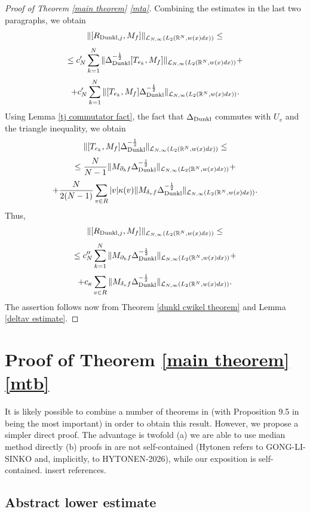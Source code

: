 \documentclass{amsart}
\begin{document}
\begin{proof}[Proof of Theorem \ref{main theorem} \eqref{mta}]
Combining the estimates in the last two paragraphs, we obtain
$$\|[R_{{\rm Dunkl},j},M_f]\|_{\mathcal{L}_{N,\infty}(L_2(\mathbb{R}^N,w(x)dx))}\leq$$
$$\leq c_N'\sum_{k=1}^N\|\Delta_{{\rm Dunkl}}^{-\frac12}[T_{e_k},M_f]\|_{\mathcal{L}_{N,\infty}(L_2(\mathbb{R}^N,w(x)dx))}+$$
$$+c_N'\sum_{k=1}^N\|[T_{e_k},M_f]\Delta_{{\rm Dunkl}}^{-\frac12}\|_{\mathcal{L}_{N,\infty}(L_2(\mathbb{R}^N,w(x)dx))}.$$
Using Lemma \ref{tj commutator fact}, the fact that $\Delta_{{\rm Dunkl}}$ commutes with $U_v$ and the triangle inequality, we obtain
$$\|[T_{e_k},M_f]\Delta_{{\rm Dunkl}}^{-\frac12}\|_{\mathcal{L}_{N,\infty}(L_2(\mathbb{R}^N,w(x)dx))}\leq$$
$$\leq\frac{N}{N-1}\|M_{\partial_kf}\Delta_{{\rm Dunkl}}^{-\frac12}\|_{\mathcal{L}_{N,\infty}(L_2(\mathbb{R}^N,w(x)dx))}+$$
$$+\frac{N}{2(N-1)}\sum_{v\in R}|v|\kappa(v)\|M_{\delta_vf}\Delta_{{\rm Dunkl}}^{-\frac12}\|_{\mathcal{L}_{N,\infty}(L_2(\mathbb{R}^N,w(x)dx))}.$$
Thus,
$$\|[R_{{\rm Dunkl},j},M_f]\|_{\mathcal{L}_{N,\infty}(L_2(\mathbb{R}^N,w(x)dx))}\leq$$
$$\leq c_N''\sum_{k=1}^N\|M_{\partial_kf}\Delta_{{\rm Dunkl}}^{-\frac12}\|_{\mathcal{L}_{N,\infty}(L_2(\mathbb{R}^N,w(x)dx))}+$$
$$+c_{\kappa}\sum_{v\in R}\|M_{\delta_vf}\Delta_{{\rm Dunkl}}^{-\frac12}\|_{\mathcal{L}_{N,\infty}(L_2(\mathbb{R}^N,w(x)dx))}.$$
The assertion follows now from Theorem \ref{dunkl cwikel theorem} and Lemma \ref{deltav estimate}.
\end{proof}

\section{Proof of Theorem \ref{main theorem} \eqref{mtb}}\label{lower estimate section}

It is likely possible to combine a number of theorems in \cite{HKarxiv} (with Proposition 9.5 in \cite{HKarxiv} being the most important) in order to obtain this result. However, we propose a simpler direct proof. The advantage is twofold (a) we are able to use median method directly (b) proofs in \cite{HKarxiv} are not self-contained (Hytonen refers to GONG-LI-SINKO and, implicitly, to HYTONEN-2026), while our exposition is self-contained. {\color{red} insert references.}

\subsection{Abstract lower estimate}
\end{document}
